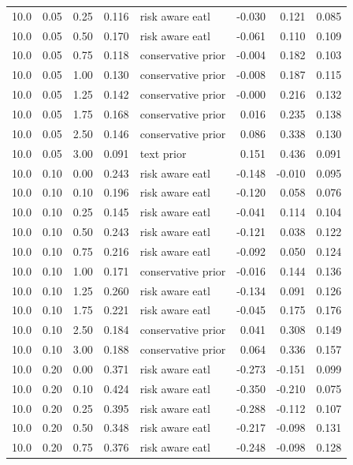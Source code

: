 \begin{longtable}{rrrrlrrr}
10.0 & 0.05 & 0.25 & 0.116 & risk aware eatl & -0.030 & 0.121 & 0.085 \\
10.0 & 0.05 & 0.50 & 0.170 & risk aware eatl & -0.061 & 0.110 & 0.109 \\
10.0 & 0.05 & 0.75 & 0.118 & conservative prior & -0.004 & 0.182 & 0.103 \\
10.0 & 0.05 & 1.00 & 0.130 & conservative prior & -0.008 & 0.187 & 0.115 \\
10.0 & 0.05 & 1.25 & 0.142 & conservative prior & -0.000 & 0.216 & 0.132 \\
10.0 & 0.05 & 1.75 & 0.168 & conservative prior & 0.016 & 0.235 & 0.138 \\
10.0 & 0.05 & 2.50 & 0.146 & conservative prior & 0.086 & 0.338 & 0.130 \\
10.0 & 0.05 & 3.00 & 0.091 & text prior & 0.151 & 0.436 & 0.091 \\
10.0 & 0.10 & 0.00 & 0.243 & risk aware eatl & -0.148 & -0.010 & 0.095 \\
10.0 & 0.10 & 0.10 & 0.196 & risk aware eatl & -0.120 & 0.058 & 0.076 \\
10.0 & 0.10 & 0.25 & 0.145 & risk aware eatl & -0.041 & 0.114 & 0.104 \\
10.0 & 0.10 & 0.50 & 0.243 & risk aware eatl & -0.121 & 0.038 & 0.122 \\
10.0 & 0.10 & 0.75 & 0.216 & risk aware eatl & -0.092 & 0.050 & 0.124 \\
10.0 & 0.10 & 1.00 & 0.171 & conservative prior & -0.016 & 0.144 & 0.136 \\
10.0 & 0.10 & 1.25 & 0.260 & risk aware eatl & -0.134 & 0.091 & 0.126 \\
10.0 & 0.10 & 1.75 & 0.221 & risk aware eatl & -0.045 & 0.175 & 0.176 \\
10.0 & 0.10 & 2.50 & 0.184 & conservative prior & 0.041 & 0.308 & 0.149 \\
10.0 & 0.10 & 3.00 & 0.188 & conservative prior & 0.064 & 0.336 & 0.157 \\
10.0 & 0.20 & 0.00 & 0.371 & risk aware eatl & -0.273 & -0.151 & 0.099 \\
10.0 & 0.20 & 0.10 & 0.424 & risk aware eatl & -0.350 & -0.210 & 0.075 \\
10.0 & 0.20 & 0.25 & 0.395 & risk aware eatl & -0.288 & -0.112 & 0.107 \\
10.0 & 0.20 & 0.50 & 0.348 & risk aware eatl & -0.217 & -0.098 & 0.131 \\
10.0 & 0.20 & 0.75 & 0.376 & risk aware eatl & -0.248 & -0.098 & 0.128 \\

\end{longtable}
